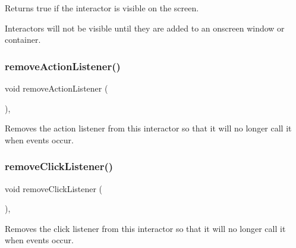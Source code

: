 Returns true if the interactor is visible on the screen. 

Interactors will not be visible until they are added to an onscreen window or container. \mbox{\label{classGInteractor_ab7fe7a876367b87cf7202f947f1d05e4}} 
\subsubsection{\texorpdfstring{remove\+Action\+Listener()}{removeActionListener()}}
{\footnotesize\ttfamily void remove\+Action\+Listener (\begin{DoxyParamCaption}{ }\end{DoxyParamCaption})\hspace{0.3cm}{\ttfamily [virtual]}, {\ttfamily [inherited]}}



Removes the action listener from this interactor so that it will no longer call it when events occur. 

\mbox{\label{classGInteractor_ad39d0325cde6b97ebda4b9d7787c633b}} 
\subsubsection{\texorpdfstring{remove\+Click\+Listener()}{removeClickListener()}}
{\footnotesize\ttfamily void remove\+Click\+Listener (\begin{DoxyParamCaption}{ }\end{DoxyParamCaption})\hspace{0.3cm}{\ttfamily [virtual]}, {\ttfamily [inherited]}}



Removes the click listener from this interactor so that it will no longer call it when events occur. 

\mbox{\label{classGInteractor_aa4250907e4cdd77349c04f0cf5cdd3d3}} 
